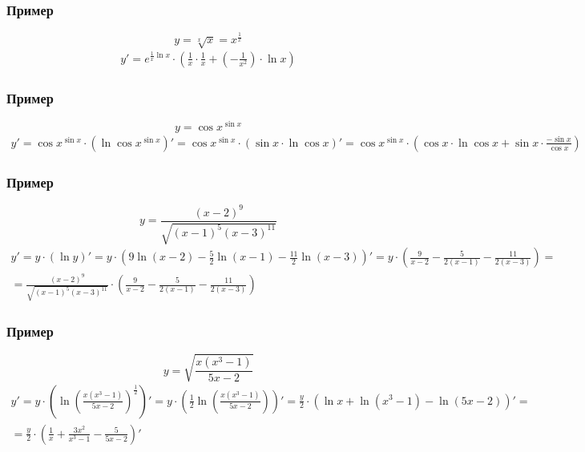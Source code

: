 \documentclass{article}
\begin{document}
\subsubsection{Пример}
\[
    y = \sqrt[x]{x} = x^{\frac{1}{x}}
\]
\begin{gather*}
    y' = e^{\frac{1}{x} \ln x} \cdot \left( \frac{1}{x} \cdot \frac{1}{x} + \left( -\frac{1}{x^2} \right) \cdot \ln x \right)
\end{gather*}

\subsubsection{Пример}
\[
    y = \cos x^{\sin x}
\]
\begin{gather*}
    y' = \cos x^{\sin x} \cdot \left( \ln \cos x^{\sin x} \right)' =
    \cos x^{\sin x} \cdot \left( \sin x \cdot \ln \cos x \right)' =
    \cos x^{\sin x} \cdot \left( \cos x \cdot \ln \cos x + \sin x \cdot \frac{-\sin x}{\cos x} \right)
\end{gather*}

\subsubsection{Пример}
\[
    y = \frac{(x - 2)^9}{\sqrt{(x - 1)^5(x - 3)^{11}}}
\]
\begin{gather*}
    y' = y \cdot (\ln y)' =
    y \cdot \left( 9\ln(x - 2) - \frac{5}{2}\ln(x - 1) - \frac{11}{2}\ln(x - 3) \right)' =
    y \cdot \left( \frac{9}{x - 2} - \frac{5}{2(x - 1)} - \frac{11}{2(x - 3)} \right) = \\
    = \frac{(x - 2)^9}{\sqrt{(x - 1)^5(x - 3)^{11}}} \cdot \left( \frac{9}{x - 2} - \frac{5}{2(x - 1)} - \frac{11}{2(x - 3)} \right)
\end{gather*}

\subsubsection{Пример}
\[
    y = \sqrt{\frac{x(x^3 - 1)}{5x - 2}}
\]
\begin{gather*}
    y' = y \cdot \left( \ln \left( \frac{x(x^3 - 1)}{5x - 2} \right)^{\frac{1}{2}} \right)' =
    y \cdot \left( \frac{1}{2} \ln \left( \frac{x(x^3 - 1)}{5x - 2} \right)\right)' =
    \frac{y}{2} \cdot \left( \ln x + \ln (x^3 - 1) - \ln(5x - 2) \right)' = \\
    = \frac{y}{2} \cdot \left( \frac{1}{x} + \frac{3x^2}{x^3 - 1} - \frac{5}{5x - 2} \right)'
\end{gather*}
\end{document}
